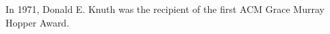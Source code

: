 \documentclass{book}
\begin{document}
\newcommand{\mycmdA}{Donald E. Knuth }
In 1971, \mycmdA was the recipient of the
first ACM Grace Murray Hopper Award.
\end{document}
